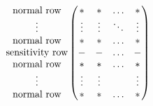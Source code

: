 \documentclass[10pt]{article} %
\begin{document}
\color{fgC}\[\begin{matrix}
\hbox{normal row} \\
\vdots \\
\hbox{normal row} \\
\hbox{sensitivity row} \\
\hbox{normal row} \\
\vdots \\
\hbox{normal row}
\end{matrix}
\begin{pmatrix}
* & *& \ldots & * \\
\vdots & \vdots & \ddots & \vdots\\
* & *& \ldots & * \\
- & - & \ldots & -\\
* & *& \ldots & * \\
\vdots & \vdots &  & \vdots\\
* & *& \ldots & * 
\end{pmatrix}\]
\end{document}
